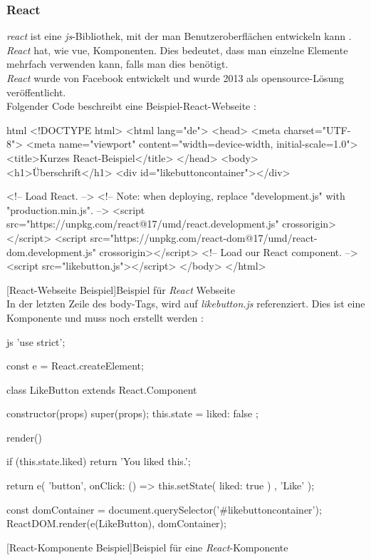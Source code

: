 \subsubsection{React}
\textit{\Gls{react}} ist eine \textit{\Gls{js}}-Bibliothek, mit der man Benutzeroberflächen entwickeln kann \cite{reactdoc}. \textit{React} hat, wie \Gls{vue}, Komponenten. Dies bedeutet, dass man einzelne Elemente mehrfach verwenden kann, falls man dies benötigt.\\
\textit{React} wurde von Facebook entwickelt und wurde 2013 als \Gls{opensource}-Lösung veröffentlicht.\\
Folgender Code beschreibt eine Beispiel-React-Webseite \cite{reactdoc}:
\begin{code}{html}
	<!DOCTYPE html>
	<html lang="de">
		<head>
			<meta charset="UTF-8">
			<meta name="viewport" content="width=device-width, initial-scale=1.0">
			<title>Kurzes React-Beispiel</title>
		</head>
		<body>
			<h1>Überschrift</h1>
			<div id="likebuttoncontainer"></div>
			
			<!-- Load React. -->
			<!-- Note: when deploying, replace "development.js" with "production.min.js". -->
			<script src="https://unpkg.com/react@17/umd/react.development.js" crossorigin></script>
			<script src="https://unpkg.com/react-dom@17/umd/react-dom.development.js" crossorigin></script>
			<!-- Load our React component. -->
			<script src="likebutton.js"></script>
		</body>
	</html>
\end{code}
[React-Webseite Beispiel]{Beispiel für \textit{React} Webseite}~\\
\newpage
In der letzten Zeile des body-Tags, wird auf \textit{likebutton.js} referenziert. Dies ist eine Komponente und muss noch erstellt werden \cite{reactdoc}:
\begin{code}{js}
	'use strict';
	
	const e = React.createElement;
	
	class LikeButton extends React.Component {
		constructor(props) {
			super(props);
			this.state = { liked: false };
		}
		
		render() {
			if (this.state.liked) {
				return 'You liked this.';
			}
			
			return e(
			'button',
			{ onClick: () => this.setState({ liked: true }) },
			'Like'
			);
		}
	}
	
	const domContainer = document.querySelector('#likebuttoncontainer');
	ReactDOM.render(e(LikeButton), domContainer);
\end{code}
[React-Komponente Beispiel]{Beispiel für eine \textit{React}-Komponente}
\newpage

